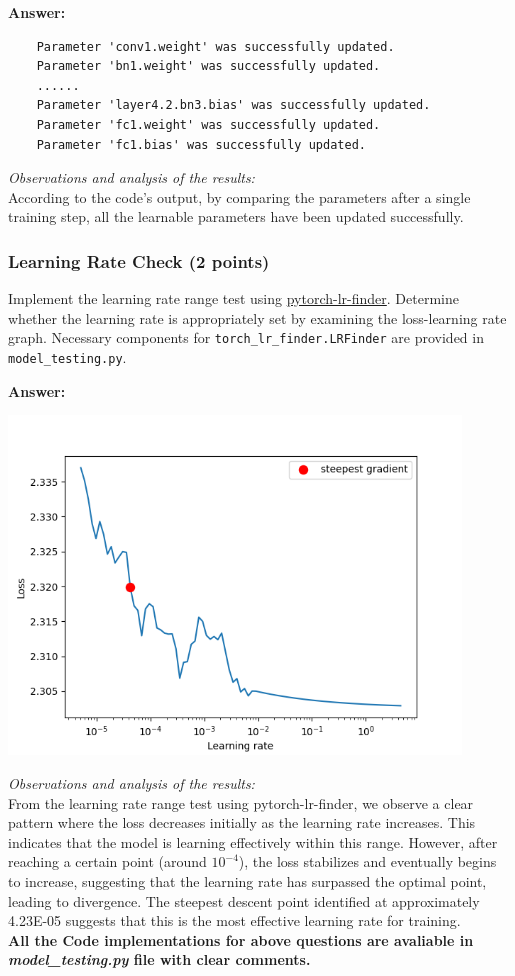 \documentclass[11pt, oneside]{article}   	%
\begin{document}
\textbf{Answer:}
\begin{verbatim}
    Parameter 'conv1.weight' was successfully updated.
    Parameter 'bn1.weight' was successfully updated.
    ......
    Parameter 'layer4.2.bn3.bias' was successfully updated.
    Parameter 'fc1.weight' was successfully updated.
    Parameter 'fc1.bias' was successfully updated.
\end{verbatim}
\textit{Observations and analysis of the results: }
\\
According to the code's output, by comparing the parameters after a single training step, all the learnable parameters have been updated successfully.

\subsubsection*{Learning Rate Check (2 points)}
Implement the learning rate range test using \href{https://github.com/davidtvs/pytorch-lr-finder#tweaked-version-from-fastaiauto}{pytorch-lr-finder}. Determine whether the learning rate is appropriately set by examining the loss-learning rate graph. Necessary components for \texttt{torch\_lr\_finder.LRFinder} are provided in \texttt{model\_testing.py}.

\textbf{Answer:} \\
\begin{center}
    \includegraphics[width=0.9\textwidth]{report_pic/learningRate.png}
\end{center}

\textit{Observations and analysis of the results: }
\\
From the learning rate range test using pytorch-lr-finder, we observe a clear pattern where the loss decreases initially as the learning rate increases. This indicates that the model is learning effectively within this range. However, after reaching a certain point (around $10^{-4}$), the loss stabilizes and eventually begins to increase, suggesting that the learning rate has surpassed the optimal point, leading to divergence. The steepest descent point identified at approximately 4.23E-05 suggests that this is the most effective learning rate for training.
\\
\textbf{All the Code implementations for above questions are avaliable in \textit{model\_testing.py} file with clear comments.}
\end{document}

